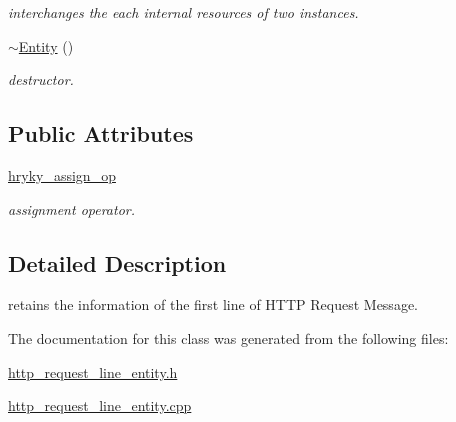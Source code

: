 \begin{DoxyCompactItemize}
\begin{DoxyCompactList}\small\item\em interchanges the each internal resources of two instances. \end{DoxyCompactList}\item 
\hypertarget{classhryky_1_1http_1_1request_1_1line_1_1_entity_a748e5b94a03f64249982a2076b1eed7d}{\hyperlink{classhryky_1_1http_1_1request_1_1line_1_1_entity_a748e5b94a03f64249982a2076b1eed7d}{$\sim$\-Entity} ()}\label{classhryky_1_1http_1_1request_1_1line_1_1_entity_a748e5b94a03f64249982a2076b1eed7d}

\begin{DoxyCompactList}\small\item\em destructor. \end{DoxyCompactList}\end{DoxyCompactItemize}
\subsection*{Public Attributes}
\begin{DoxyCompactItemize}
\item 
\hypertarget{classhryky_1_1http_1_1request_1_1line_1_1_entity_aa41b4e93672733f155c6bbfa6b087b5f}{\hyperlink{classhryky_1_1http_1_1request_1_1line_1_1_entity_aa41b4e93672733f155c6bbfa6b087b5f}{hryky\-\_\-assign\-\_\-op}}\label{classhryky_1_1http_1_1request_1_1line_1_1_entity_aa41b4e93672733f155c6bbfa6b087b5f}

\begin{DoxyCompactList}\small\item\em assignment operator. \end{DoxyCompactList}\end{DoxyCompactItemize}


\subsection{Detailed Description}
retains the information of the first line of H\-T\-T\-P Request Message. 

The documentation for this class was generated from the following files\-:\begin{DoxyCompactItemize}
\item 
\hyperlink{http__request__line__entity_8h}{http\-\_\-request\-\_\-line\-\_\-entity.\-h}\item 
\hyperlink{http__request__line__entity_8cpp}{http\-\_\-request\-\_\-line\-\_\-entity.\-cpp}\end{DoxyCompactItemize}
